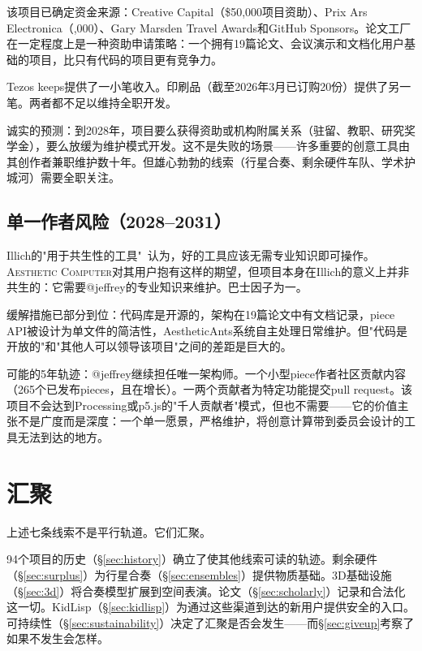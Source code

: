 \documentclass[10pt,letterpaper,twocolumn]{article}
\newcommand{\ac}{\textsc{Aesthetic Computer}}
\begin{document}
该项目已确定资金来源：Creative Capital（\$50,000项目资助）、Prix Ars Electronica（,000）、Gary Marsden Travel Awards和GitHub Sponsors。论文工厂在一定程度上是一种资助申请策略：一个拥有19篇论文、会议演示和文档化用户基础的项目，比只有代码的项目更有竞争力。

Tezos keeps提供了一小笔收入。印刷品（截至2026年3月已订购20份）提供了另一笔。两者都不足以维持全职开发。

诚实的预测：到2028年，项目要么获得资助或机构附属关系（驻留、教职、研究奖学金），要么放缓为维护模式开发。这不是失败的场景——许多重要的创意工具由其创作者兼职维护数十年。但雄心勃勃的线索（行星合奏、剩余硬件车队、学术护城河）需要全职关注。

\subsection{单一作者风险（2028--2031）}

Illich的"用于共生性的工具"~\citep{illich1973tools}认为，好的工具应该无需专业知识即可操作。\ac{}对其用户抱有这样的期望，但项目本身在Illich的意义上并非共生的：它需要@jeffrey的专业知识来维护。巴士因子为一。

缓解措施已部分到位：代码库是开源的，架构在19篇论文中有文档记录，piece API被设计为单文件的简洁性，AestheticAnts系统自主处理日常维护。但"代码是开放的"和"其他人可以领导该项目"之间的差距是巨大的。

可能的5年轨迹：@jeffrey继续担任唯一架构师。一个小型piece作者社区贡献内容（265个已发布pieces，且在增长）。一两个贡献者为特定功能提交pull request。该项目不会达到Processing或p5.js的"千人贡献者"模式，但也不需要——它的价值主张不是广度而是深度：一个单一愿景，严格维护，将创意计算带到委员会设计的工具无法到达的地方。


\section{汇聚}
\label{sec:convergence}

上述七条线索不是平行轨道。它们汇聚。

94个项目的历史（\S\ref{sec:history}）确立了使其他线索可读的轨迹。剩余硬件（\S\ref{sec:surplus}）为行星合奏（\S\ref{sec:ensembles}）提供物质基础。3D基础设施（\S\ref{sec:3d}）将合奏模型扩展到空间表演。论文（\S\ref{sec:scholarly}）记录和合法化这一切。KidLisp（\S\ref{sec:kidlisp}）为通过这些渠道到达的新用户提供安全的入口。可持续性（\S\ref{sec:sustainability}）决定了汇聚是否会发生——而\S\ref{sec:giveup}考察了如果不发生会怎样。
\end{document}
